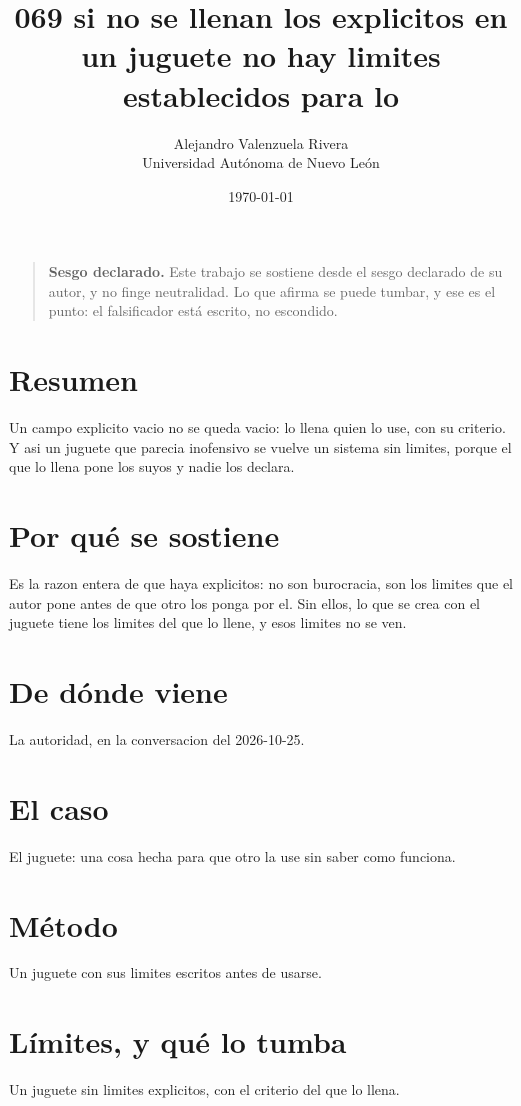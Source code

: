 \documentclass[11pt,a4paper]{article}
\title{069 si no se llenan los explicitos en un juguete no hay limites establecidos para lo}
\author{Alejandro Valenzuela Rivera\\\small Universidad Autónoma de Nuevo León}
\date{\today}
\begin{document}
\maketitle

\begin{quote}
\textbf{Sesgo declarado.} Este trabajo se sostiene desde el sesgo declarado de su autor, y no finge neutralidad. Lo que afirma se puede tumbar, y ese es el punto: el falsificador está escrito, no escondido.
\end{quote}

\section*{Resumen}
Un campo explicito vacio no se queda vacio: lo llena quien lo use, con su criterio. Y asi un juguete que parecia inofensivo se vuelve un sistema sin limites, porque el que lo llena pone los suyos y nadie los declara.

\section{Por qué se sostiene}
Es la razon entera de que haya explicitos: no son burocracia, son los limites que el autor pone antes de que otro los ponga por el. Sin ellos, lo que se crea con el juguete tiene los limites del que lo llene, y esos limites no se ven.

\section{De dónde viene}
La autoridad, en la conversacion del 2026-10-25.

\section{El caso}
El juguete: una cosa hecha para que otro la use sin saber como funciona.

\section{Método}
Un juguete con sus limites escritos antes de usarse.

\section{Límites, y qué lo tumba}
Un juguete sin limites explicitos, con el criterio del que lo llena.
\end{document}
